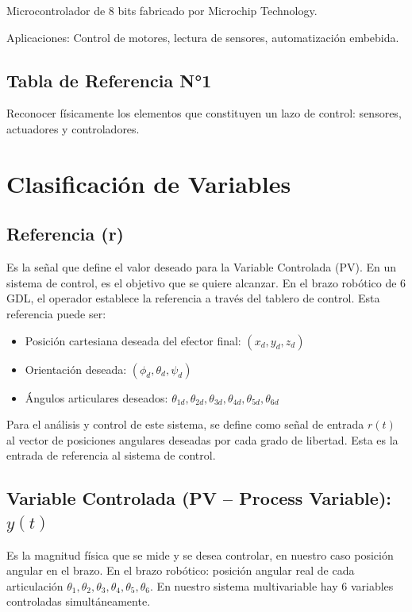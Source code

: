 \documentclass[11pt]{article}
\begin{document}
Microcontrolador de 8 bits fabricado por Microchip Technology.



Aplicaciones: Control de motores, lectura de sensores, automatización embebida.

\subsection{Tabla de Referencia N°1}

Reconocer físicamente los elementos que constituyen un lazo de control: sensores, actuadores y controladores.



\section{Clasificación de Variables}

\subsection{Referencia (r)}

Es la señal que define el valor deseado para la Variable Controlada (PV). En un sistema de control, es el objetivo que se quiere alcanzar. En el brazo robótico de 6 GDL, el operador establece la referencia a través del tablero de control. Esta referencia puede ser:

\begin{itemize}
	\item Posición cartesiana deseada del efector final: $(x_d, y_d, z_d)$
	\item Orientación deseada: $(\phi_d, \theta_d, \psi_d)$
	\item Ángulos articulares deseados: $\theta_{1d}, \theta_{2d}, \theta_{3d}, \theta_{4d}, \theta_{5d}, \theta_{6d}$
\end{itemize}

Para el análisis y control de este sistema, se define como señal de entrada $r(t)$ al vector de posiciones angulares deseadas por cada grado de libertad. Esta es la entrada de referencia al sistema de control.

\subsection{Variable Controlada (PV – Process Variable): $y(t)$}

Es la magnitud física que se mide y se desea controlar, en nuestro caso posición angular en el brazo. En el brazo robótico: posición angular real de cada articulación $\theta_1, \theta_2, \theta_3, \theta_4, \theta_5, \theta_6$. En nuestro sistema multivariable hay 6 variables controladas simultáneamente.
\end{document}
